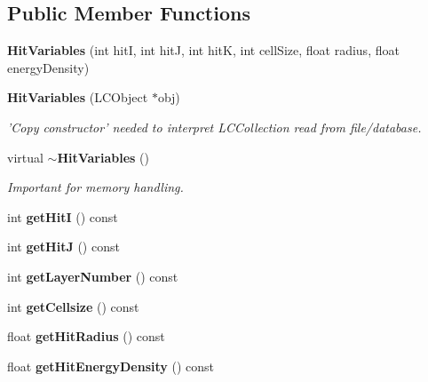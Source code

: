 \subsection*{Public Member Functions}
\begin{DoxyCompactItemize}
\item 
{\bfseries Hit\-Variables} (int hit\-I, int hit\-J, int hit\-K, int cell\-Size, float radius, float energy\-Density)\label{classCALICE_1_1HitVariables_a378045582b964de5d17119ec2375daad}

\item 
{\bf Hit\-Variables} (L\-C\-Object $\ast$obj)\label{classCALICE_1_1HitVariables_a4397ae7d9e96b2eb7f728bdf403598d0}

\begin{DoxyCompactList}\small\item\em 'Copy constructor' needed to interpret L\-C\-Collection read from file/database. \end{DoxyCompactList}\item 
virtual {\bf $\sim$\-Hit\-Variables} ()\label{classCALICE_1_1HitVariables_ae9d8facba1cd74e024eb4163574442ef}

\begin{DoxyCompactList}\small\item\em Important for memory handling. \end{DoxyCompactList}\item 
int {\bfseries get\-Hit\-I} () const \label{classCALICE_1_1HitVariables_a57f0b73d684d5b49d2284bbed85f518e}

\item 
int {\bfseries get\-Hit\-J} () const \label{classCALICE_1_1HitVariables_ab3704eedf5fd5b2ea5ad0a58b81cbbdc}

\item 
int {\bfseries get\-Layer\-Number} () const \label{classCALICE_1_1HitVariables_a77232ae72c4b7e36be532c8fb4be1185}

\item 
int {\bfseries get\-Cellsize} () const \label{classCALICE_1_1HitVariables_a170f2cb64c1c459bc5772b1d83808d03}

\item 
float {\bfseries get\-Hit\-Radius} () const \label{classCALICE_1_1HitVariables_aca1dc848fbaab31a6b3eb8f559bc245c}

\item 
float {\bfseries get\-Hit\-Energy\-Density} () const \label{classCALICE_1_1HitVariables_a1f4d9930ce41b89b66daa272526485ce}


\end{DoxyCompactItemize}
